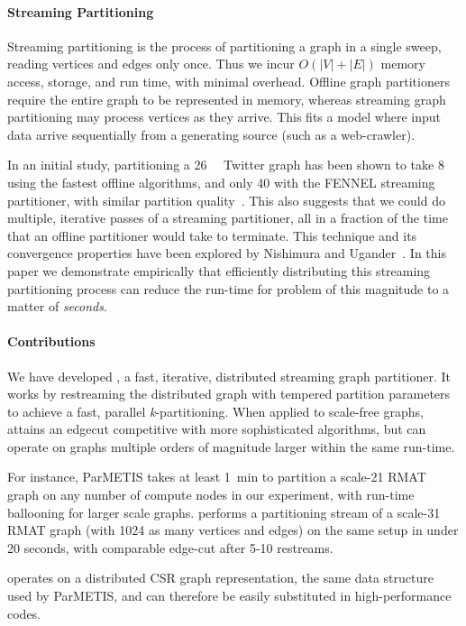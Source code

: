 \paragraph{Streaming Partitioning}
Streaming partitioning is the process of partitioning a graph in a single sweep, reading vertices and edges only once. Thus we incur $O(|V| + |E|)$ memory access, storage, and run time, with minimal overhead. Offline graph partitioners require the entire graph to be represented in memory, whereas streaming graph partitioning may process vertices as they arrive. This fits a model where input data arrive sequentially from a generating source (such as a web-crawler).

In an initial study, partitioning a \SI{26}{\giga\byte} Twitter graph has been shown to take \SI[abbreviations=false]{8}{\hours} using the fastest offline algorithms, and only \SI{40}{\minutes} with the FENNEL streaming partitioner, with similar partition quality~\cite{tsourakakis2012fennel}. This also suggests that we could do multiple, iterative passes of a streaming partitioner, all in a fraction of the time that an offline partitioner would take to terminate. This technique and its convergence properties have been explored by Nishimura and Ugander~\cite{nishimura2013restream}. In this paper we demonstrate empirically that efficiently distributing this streaming partitioning process can reduce the run-time for problem of this magnitude to a matter of \emph{seconds}. 

\paragraph{Contributions}
We have developed \ourmethod, a fast, iterative, distributed streaming graph partitioner.
It works by restreaming the distributed graph with tempered partition parameters to achieve a fast, parallel \textit{k}-partitioning. When applied to scale-free graphs, \ourmethod attains an edgecut competitive with more sophisticated algorithms, but can operate on graphs multiple orders of magnitude larger within the same run-time. 

For instance, ParMETIS takes at least \SI{1}{\minute} to partition a scale-21 RMAT graph on any number of compute nodes in our experiment, with run-time ballooning for larger scale graphs. \ourmethod performs a partitioning stream of a scale-31 RMAT graph (with 1024 as many vertices and edges) on the same setup in under 20 seconds, with comparable edge-cut after 5-10 restreams.

\ourmethod operates on a distributed CSR graph representation, the same data structure used by ParMETIS, and can therefore be easily substituted in high-performance codes. 

